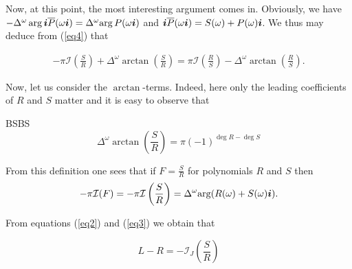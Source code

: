 \documentclass[10pt,a4paper]{article}
\begin{document}
Now, at this point, the most interesting argument comes in. Obviously, we have  $-\Delta^\omega\arg{\boldsymbol{i}\overline{P}(\omega\boldsymbol{i})}=\Delta^\omega{\arg{P(\omega\boldsymbol{i})}}$ and $\boldsymbol{i}\overline{P}(\omega\boldsymbol{i})=S(\omega)+P(\omega)\boldsymbol{i}$. We thus may deduce from (\ref{eq4}) that 

\begin{align}
-\pi\mathcal{I}\left(\frac{S}{R}\right)+\Delta^\omega{\arctan\left(\frac{S}{R}\right)} = \pi\mathcal{I}\left(\frac{R}{S}\right)-\Delta^\omega{\arctan\left(\frac{R}{S}\right)}\text{.}
\end{align}

Now, let us consider the $\arctan$-terms. Indeed, here only the leading coefficients of $R$ and $S$ matter and it is easy to observe that 

BSBS
\begin{equation}
\Delta^\omega{\arctan\left(\frac{S}{R}\right)}=\pi(-1)^{\deg{R}-\deg{S}}
\end{equation}


From this definition one sees  that if $F=\frac{S}{R}$ for polynomials $R$ and $S$ then
\begin{equation}
-\pi\mathcal{I}(F)=-\pi\mathcal{I}\left(\frac{S}{R}\right)=\Delta^\omega{\arg(R(\omega)+S(\omega)\boldsymbol{i})}\label{eq3}\text{.}
\end{equation}
 
From equations (\ref{eq2}) and (\ref{eq3}) we obtain that 

\begin{equation}
L-R = -\mathcal{I}_J\left(\frac{S}{R}\right)
\end{equation}
 
\end{document}
